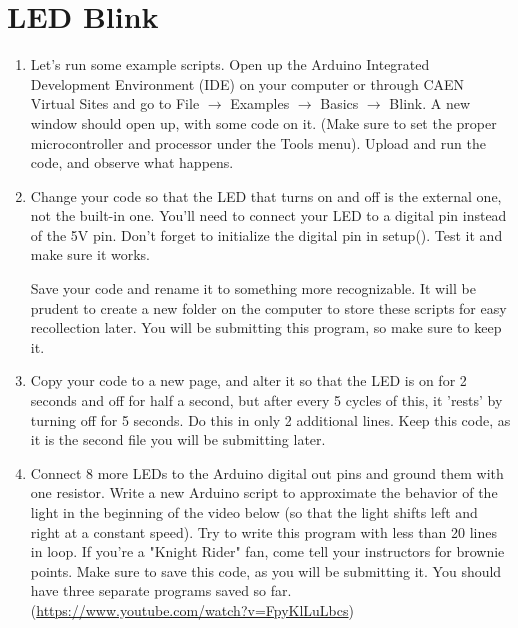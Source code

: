 \documentclass[12pt]{article}
\begin{document}
	\section{LED Blink}
	\begin{enumerate}
		
		\item Let’s run some example scripts. Open up the Arduino Integrated Development Environment (IDE) on your computer or through CAEN Virtual Sites and go to File $\rightarrow$ Examples $\rightarrow$ Basics $\rightarrow$ Blink. A new window should open up, with some code on it. (Make sure to set the proper microcontroller and processor under the Tools menu). Upload and run the code, and observe what happens.
	
		\item Change your code so that the LED that turns on and off is the external one, not the built-in one. You'll need to connect your LED to a digital pin instead of the 5V pin. Don't forget to initialize the digital pin in setup(). Test it and make sure it works. 
		
		{\raggedright{}Save your code and rename it to something more recognizable. It will be prudent to create a new folder on the computer to store these scripts for easy recollection later. You will be submitting this program, so make sure to keep it.}
	
		\item Copy your code to a new page, and alter it so that the LED is on for 2 seconds and off for half a second, but after every 5 cycles of this, it 'rests' by turning off for 5 seconds. Do this in only 2 additional lines. Keep this code, as it is the second file you will be submitting later.
	
		\item Connect 8 more LEDs to the Arduino digital out pins and ground them with one resistor. Write a new Arduino script to approximate the behavior of the light in the beginning of the video below (so that the light shifts left and right at a constant speed). Try to write this program with less than 20 lines in loop. If you're a "Knight Rider" fan, come tell your instructors for brownie points. Make sure to save this code, as you will be submitting it. You should have three separate programs saved so far. \\ (\url{https://www.youtube.com/watch?v=FpyKlLuLbcs})
	\end{enumerate}
	
\end{document}
